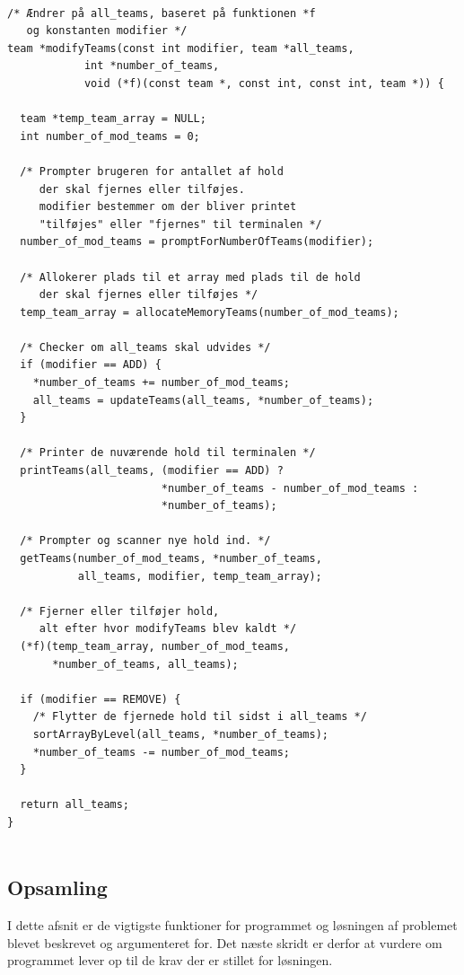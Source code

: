 \begin{listing}[H]
\begin{verbatim}

/* Ændrer på all_teams, baseret på funktionen *f 
   og konstanten modifier */
team *modifyTeams(const int modifier, team *all_teams, 
            int *number_of_teams, 
            void (*f)(const team *, const int, const int, team *)) {
           
  team *temp_team_array = NULL;
  int number_of_mod_teams = 0;

  /* Prompter brugeren for antallet af hold 
     der skal fjernes eller tilføjes.
     modifier bestemmer om der bliver printet 
     "tilføjes" eller "fjernes" til terminalen */
  number_of_mod_teams = promptForNumberOfTeams(modifier);

  /* Allokerer plads til et array med plads til de hold 
     der skal fjernes eller tilføjes */
  temp_team_array = allocateMemoryTeams(number_of_mod_teams);

  /* Checker om all_teams skal udvides */
  if (modifier == ADD) {
    *number_of_teams += number_of_mod_teams;
    all_teams = updateTeams(all_teams, *number_of_teams);
  }

  /* Printer de nuværende hold til terminalen */
  printTeams(all_teams, (modifier == ADD) ? 
                        *number_of_teams - number_of_mod_teams : 
                        *number_of_teams);

  /* Prompter og scanner nye hold ind. */
  getTeams(number_of_mod_teams, *number_of_teams, 
           all_teams, modifier, temp_team_array);

  /* Fjerner eller tilføjer hold, 
     alt efter hvor modifyTeams blev kaldt */
  (*f)(temp_team_array, number_of_mod_teams, 
       *number_of_teams, all_teams);

  if (modifier == REMOVE) {
    /* Flytter de fjernede hold til sidst i all_teams */
    sortArrayByLevel(all_teams, *number_of_teams);
    *number_of_teams -= number_of_mod_teams;
  }

  return all_teams;
}


\end{verbatim}
\label{code:modifyTeams}
\end{listing}

\subsection*{Opsamling} 
I dette afsnit er de vigtigste funktioner for programmet og løsningen af problemet blevet beskrevet og argumenteret for. Det næste skridt er derfor at vurdere om programmet lever op til de krav der er stillet for løsningen. 




